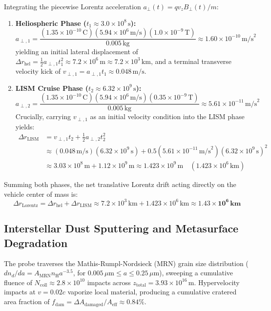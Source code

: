 \documentclass[11pt, a4paper]{article}
\begin{document}
Integrating the piecewise Lorentz acceleration $a_{\perp}(t) = q v_z B_{\perp}(t) / m$:
\begin{enumerate}
    \item \textbf{Heliospheric Phase ($t_1 \approx 3.0 \times 10^8\,\text{s}$):}
    \begin{equation}
        a_{\perp,1} = \frac{(1.35 \times 10^{-10}\,\text{C})(5.94 \times 10^6\,\text{m/s})(1.0 \times 10^{-9}\,\text{T})}{0.005\,\text{kg}} \approx 1.60 \times 10^{-10}\,\text{m/s}^2
    \end{equation}
    yielding an initial lateral displacement of $\Delta r_{\text{hel}} = \frac{1}{2} a_{\perp,1} t_1^2 \approx 7.2 \times 10^6\,\text{m} \approx 7.2 \times 10^3\,\text{km}$, and a terminal transverse velocity kick of $v_{\perp,1} = a_{\perp,1} t_1 \approx 0.048\,\text{m/s}$.
    \item \textbf{LISM Cruise Phase ($t_2 \approx 6.32 \times 10^9\,\text{s}$):}
    \begin{equation}
        a_{\perp,2} = \frac{(1.35 \times 10^{-10}\,\text{C})(5.94 \times 10^6\,\text{m/s})(0.35 \times 10^{-9}\,\text{T})}{0.005\,\text{kg}} \approx 5.61 \times 10^{-11}\,\text{m/s}^2
    \end{equation}
    Crucially, carrying $v_{\perp,1}$ as an initial velocity condition into the LISM phase yields:
    \begin{align}
        \Delta r_{\text{LISM}} &= v_{\perp,1} t_2 + \frac{1}{2} a_{\perp,2} t_2^2 \nonumber \\
        &\approx (0.048\,\text{m/s})(6.32 \times 10^9\,\text{s}) + 0.5(5.61 \times 10^{-11}\,\text{m/s}^2)(6.32 \times 10^9\,\text{s})^2 \nonumber \\
        &\approx 3.03 \times 10^8\,\text{m} + 1.12 \times 10^9\,\text{m} \approx 1.423 \times 10^9\,\text{m} \quad (1.423 \times 10^6\,\text{km})
    \end{align}
\end{enumerate}
Summing both phases, the net translative Lorentz drift acting directly on the vehicle center of mass is:
\begin{equation}
    \Delta r_{\text{Lorentz}} = \Delta r_{\text{hel}} + \Delta r_{\text{LISM}} \approx 7.2 \times 10^3\,\text{km} + 1.423 \times 10^6\,\text{km} \approx \mathbf{1.43 \times 10^6\,\text{km}}
\end{equation}

\subsection{Interstellar Dust Sputtering and Metasurface Degradation}
The probe traverses the Mathis-Rumpl-Nordsieck (MRN) grain size distribution ($dn_d/da = A_{\text{MRN}} n_{\text{H}} a^{-3.5}$, for $0.005\,\mu\text{m} \le a \le 0.25\,\mu\text{m}$), sweeping a cumulative fluence of $N_{\text{coll}} \approx 2.8 \times 10^{10}$ impacts across $z_{\text{total}} = 3.93 \times 10^{16}\,\text{m}$. Hypervelocity impacts at $v = 0.02c$ vaporize local material, producing a cumulative cratered area fraction of $f_{\text{dam}} = \Delta A_{\text{damaged}} / A_{\text{eff}} \approx 0.84\%$.
\end{document}
